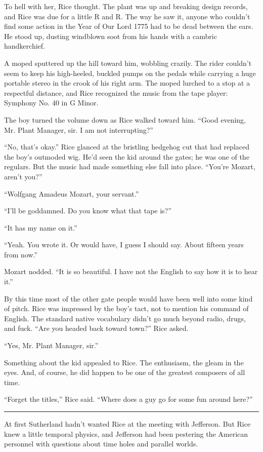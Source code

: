 To hell with her, Rice thought. The plant was up and breaking design records, and Rice was due for a little R and R. The way he saw it, anyone who couldn't find some action in the Year of Our Lord 1775 had to be dead between the ears. He stood up, dusting windblown soot from his hands with a cambric handkerchief.

A moped sputtered up the hill toward him, wobbling crazily. The rider couldn't seem to keep his high-heeled, buckled pumps on the pedals while carrying a huge portable stereo in the crook of his right arm. The moped lurched to a stop at a respectful distance, and Rice recognized the music from the tape player: Symphony No. 40 in G Minor.

The boy turned the volume down as Rice walked toward him. ``Good evening, Mr. Plant Manager, sir. I am not interrupting?''

``No, that's okay.'' Rice glanced at the bristling hedgehog cut that had replaced the boy's outmoded wig. He'd seen the kid around the gates; he was one of the regulars. But the music had made something else fall into place. ``You're Mozart, aren't you?''

``Wolfgang Amadeus Mozart, your servant.''

``I'll be goddamned. Do you know what that tape is?''

``It has my name on it.''

``Yeah. You wrote it. Or would have, I guess I should say. About fifteen years from now.''

Mozart nodded. ``It is so beautiful. I have not the English to say how it is to hear it.''

By this time most of the other gate people would have been well into some kind of pitch. Rice was impressed by the boy's tact, not to mention his command of English. The standard native vocabulary didn't go much beyond radio, drugs, and fuck. ``Are you headed back toward town?'' Rice asked.

``Yes, Mr. Plant Manager, sir.''

Something about the kid appealed to Rice. The enthusiasm, the gleam in the eyes. And, of course, he did happen to be one of the greatest composers of all time.

``Forget the titles,'' Rice said. ``Where does a guy go for some fun around here?''

\fancybreak{* * *}

At first Sutherland hadn't wanted Rice at the meeting with Jefferson. But Rice knew a little temporal physics, and Jefferson had been pestering the American personnel with questions about time holes and parallel worlds.


